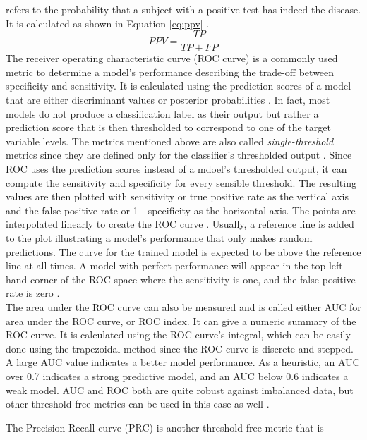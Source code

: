 refers to the probability that a subject with a positive test has indeed the 
disease. It is calculated as shown in Equation \ref{eq:ppv} \cite{RN168}.
\begin{equation}
 PPV = \frac{TP}{TP+FP}
 \label{eq:ppv}
\end{equation}
The receiver operating characteristic curve (ROC curve) is a commonly used 
metric to determine a model's performance describing the trade-off between 
specificity and sensitivity. It is calculated using the prediction scores of a 
model that are either discriminant values or posterior 
probabilities \cite{RN161}. In fact, most models do not produce a 
classification label as their output but rather a prediction score that is then 
thresholded to correspond to one of the target variable levels. The metrics 
mentioned above are also called \textit{single-threshold} metrics since they 
are defined only for the classifier's thresholded output \cite{RN161, RN167}. 
Since ROC uses the prediction scores instead of a mdoel's thresholded output, 
it can compute the sensitivity and specificity for every sensible threshold. 
The resulting values are then plotted with sensitivity or true positive rate as 
the vertical axis and the false positive rate or 1 - specificity as the 
horizontal axis. The points are interpolated linearly to create the ROC curve  
\cite{RN161}. Usually, a reference line is added to the plot illustrating a 
model's performance that only makes random predictions. The curve for the 
trained model is expected to be above the reference line at all times. 
A model with perfect performance will appear in the top left-hand corner 
of the ROC space where the sensitivity is one, and the false positive rate is 
zero \cite{RN167, RN159}.
\\
The area under the ROC curve can also be measured and is called either AUC for 
area under the ROC curve, or ROC index. It can give a numeric summary of the 
ROC curve. It is calculated using the ROC curve's integral, which can be easily 
done using the trapezoidal method since the ROC curve is discrete and stepped. 
A large AUC value indicates a better model performance. As a heuristic, an 
AUC over 0.7 indicates a strong predictive model, and an AUC below 0.6 
indicates 
a weak model. AUC and ROC both are quite robust against imbalanced data, but 
other threshold-free metrics can be used in this case as 
well \cite{RN167, RN159}.
\par
The Precision-Recall curve (PRC) is another threshold-free metric that is 
